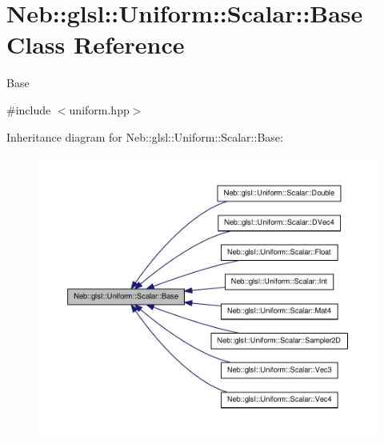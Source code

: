 \hypertarget{classNeb_1_1glsl_1_1Uniform_1_1Scalar_1_1Base}{\section{\-Neb\-:\-:glsl\-:\-:\-Uniform\-:\-:\-Scalar\-:\-:\-Base \-Class \-Reference}
\label{classNeb_1_1glsl_1_1Uniform_1_1Scalar_1_1Base}
}


\-Base  




{\ttfamily \#include $<$uniform.\-hpp$>$}



\-Inheritance diagram for \-Neb\-:\-:glsl\-:\-:\-Uniform\-:\-:\-Scalar\-:\-:\-Base\-:\nopagebreak
\begin{figure}[H]
\begin{center}
\leavevmode
\includegraphics[width=350pt]{classNeb_1_1glsl_1_1Uniform_1_1Scalar_1_1Base__inherit__graph}
\end{center}
\end{figure}

